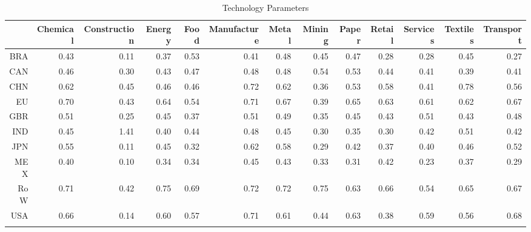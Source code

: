 \begin{longtable}{rrrrrrrrrrrrr}
\caption{Technology Parameters} \\ 
  \hline
 & Chemical & Construction & Energy & Food & Manufacture & Metal & Mining & Paper & Retail & Services & Textiles & Transport \\ 
  \hline
BRA & 0.43 & 0.11 & 0.37 & 0.53 & 0.41 & 0.48 & 0.45 & 0.47 & 0.28 & 0.28 & 0.45 & 0.27 \\ 
  CAN & 0.46 & 0.30 & 0.43 & 0.47 & 0.48 & 0.48 & 0.54 & 0.53 & 0.44 & 0.41 & 0.39 & 0.41 \\ 
  CHN & 0.62 & 0.45 & 0.46 & 0.46 & 0.72 & 0.62 & 0.36 & 0.53 & 0.58 & 0.41 & 0.78 & 0.56 \\ 
  EU & 0.70 & 0.43 & 0.64 & 0.54 & 0.71 & 0.67 & 0.39 & 0.65 & 0.63 & 0.61 & 0.62 & 0.67 \\ 
  GBR & 0.51 & 0.25 & 0.45 & 0.37 & 0.51 & 0.49 & 0.35 & 0.45 & 0.43 & 0.51 & 0.43 & 0.48 \\ 
  IND & 0.45 & 1.41 & 0.40 & 0.44 & 0.48 & 0.45 & 0.30 & 0.35 & 0.30 & 0.42 & 0.51 & 0.42 \\ 
  JPN & 0.55 & 0.11 & 0.45 & 0.32 & 0.62 & 0.58 & 0.29 & 0.42 & 0.37 & 0.40 & 0.46 & 0.52 \\ 
  MEX & 0.40 & 0.10 & 0.34 & 0.34 & 0.45 & 0.43 & 0.33 & 0.31 & 0.42 & 0.23 & 0.37 & 0.29 \\ 
  RoW & 0.71 & 0.42 & 0.75 & 0.69 & 0.72 & 0.72 & 0.75 & 0.63 & 0.66 & 0.54 & 0.65 & 0.67 \\ 
  USA & 0.66 & 0.14 & 0.60 & 0.57 & 0.71 & 0.61 & 0.44 & 0.63 & 0.38 & 0.59 & 0.56 & 0.68 \\ 
   \hline
\hline
\label{tab:technology}
\end{longtable}
